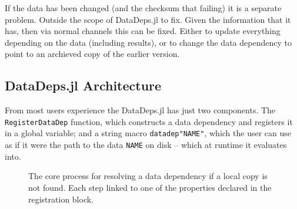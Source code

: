 \documentclass{jors}
\newcommand{\datadep}[1]{\texttt{datadep"{}#1"{}}}
\begin{document}
If the data has been changed (and the checksum that failing) it is a separate problem.
Outside the scope of DataDeps.jl to fix.
Given the information that it has, then via normal channels this can be fixed.
Either to update everything depending on the data (including results),
or to change the data dependency to point to an archieved copy of the earlier version.




\subsection{DataDeps.jl Architecture}
From most users experience the DataDeps.jl has just two components.
The \texttt{RegisterDataDep} function, which constructs a data dependency and registers it in a global variable;
and  a string macro \datadep{NAME}, which the user can use as if it were the path to the data \texttt{NAME} on disk -- which at runtime it evaluates into.


\begin{figure}
	\caption{The core process for resolving a data dependency if a local copy is not found. Each step linked to one of the properties declared in the registration block.}
\end{figure}
\end{document}
